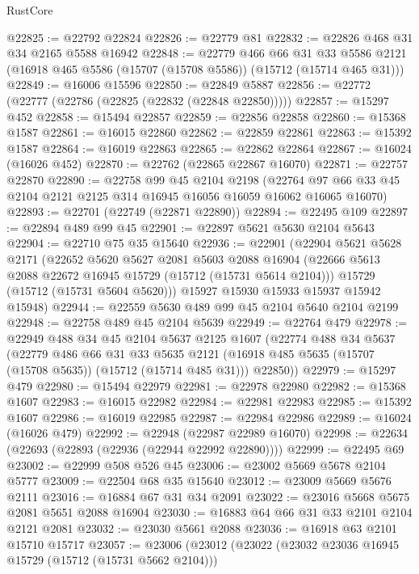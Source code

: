 \begin{lexlean}{RustCore}
\begin{coremodule}
@22825 := @22792 @22824
@22826 := @22779 @81
@22832 := @22826 @468 @31 @34 @2165 @5588 @16942
@22848 := @22779
    @466
    @66
    @31
    @33
    @5586
    @2121
    (@16918 @465 @5586 (@15707 (@15708 @5586)) (@15712 (@15714 @465 @31)))
@22849 := @16006 @15596
@22850 := @22849 @5887
@22856 := @22772 (@22777 (@22786 (@22825 (@22832 (@22848 @22850)))))
@22857 := @15297 @452
@22858 := @15494 @22857
@22859 := @22856 @22858
@22860 := @15368 @1587
@22861 := @16015 @22860
@22862 := @22859 @22861
@22863 := @15392 @1587
@22864 := @16019 @22863
@22865 := @22862 @22864
@22867 := @16024 (@16026 @452)
@22870 := @22762 (@22865 @22867 @16070)
@22871 := @22757 @22870
@22890 := @22758
    @99
    @45
    @2104
    @2198
    (@22764 @97 @66 @33 @45 @2104 @2121 @2125 @314 @16945 @16056 @16059 @16062 @16065 @16070)
@22893 := @22701 (@22749 (@22871 @22890))
@22894 := @22495 @109
@22897 := @22894 @489 @99 @45
@22901 := @22897 @5621 @5630 @2104 @5643
@22904 := @22710 @75 @35 @15640
@22936 := @22901
    (@22904
      @5621
      @5628
      @2171
      (@22652
        @5620
        @5627
        @2081
        @5603
        @2088
        @16904
        (@22666 @5613 @2088 @22672 @16945 @15729 (@15712 (@15731 @5614 @2104)))
        @15729
        (@15712 (@15731 @5604 @5620)))
      @15927
      @15930
      @15933
      @15937
      @15942
      @15948)
@22944 := @22559 @5630 @489 @99 @45 @2104 @5640 @2104 @2199
@22948 := @22758 @489 @45 @2104 @5639
@22949 := @22764 @479
@22978 := @22949
    @488
    @34
    @45
    @2104
    @5637
    @2125
    @1607
    (@22774
      @488
      @34
      @5637
      (@22779
        @486
        @66
        @31
        @33
        @5635
        @2121
        (@16918 @485 @5635 (@15707 (@15708 @5635)) (@15712 (@15714 @485 @31)))
        @22850))
@22979 := @15297 @479
@22980 := @15494 @22979
@22981 := @22978 @22980
@22982 := @15368 @1607
@22983 := @16015 @22982
@22984 := @22981 @22983
@22985 := @15392 @1607
@22986 := @16019 @22985
@22987 := @22984 @22986
@22989 := @16024 (@16026 @479)
@22992 := @22948 (@22987 @22989 @16070)
@22998 := @22634 (@22693 (@22893 (@22936 (@22944 @22992 @22890))))
@22999 := @22495 @69
@23002 := @22999 @508 @526 @45
@23006 := @23002 @5669 @5678 @2104 @5777
@23009 := @22504 @68 @35 @15640
@23012 := @23009 @5669 @5676 @2111
@23016 := @16884 @67 @31 @34 @2091
@23022 := @23016 @5668 @5675 @2081 @5651 @2088 @16904
@23030 := @16883 @64 @66 @31 @33 @2101 @2104 @2121 @2081
@23032 := @23030 @5661 @2088
@23036 := @16918 @63 @2101 @15710 @15717
@23057 := @23006
    (@23012
      (@23022
        (@23032 @23036 @16945 @15729 (@15712 (@15731 @5662 @2104)))

\end{coremodule}
\end{lexlean}
